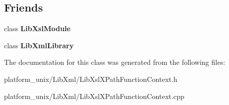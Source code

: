 \subsection*{\-Friends}
\begin{DoxyCompactItemize}
\item 
\hypertarget{classgeneral__server_1_1LibXslXPathFunctionContext_a3b0897c5b999da76a2a25143cc374ed1}{class {\bfseries \-Lib\-Xsl\-Module}}\label{classgeneral__server_1_1LibXslXPathFunctionContext_a3b0897c5b999da76a2a25143cc374ed1}

\item 
\hypertarget{classgeneral__server_1_1LibXslXPathFunctionContext_ab76a8c8b514e08e13c811de729a94ce4}{class {\bfseries \-Lib\-Xml\-Library}}\label{classgeneral__server_1_1LibXslXPathFunctionContext_ab76a8c8b514e08e13c811de729a94ce4}

\end{DoxyCompactItemize}


\-The documentation for this class was generated from the following files\-:\begin{DoxyCompactItemize}
\item 
platform\-\_\-unix/\-Lib\-Xml/\-Lib\-Xsl\-X\-Path\-Function\-Context.\-h\item 
platform\-\_\-unix/\-Lib\-Xml/\-Lib\-Xsl\-X\-Path\-Function\-Context.\-cpp\end{DoxyCompactItemize}
